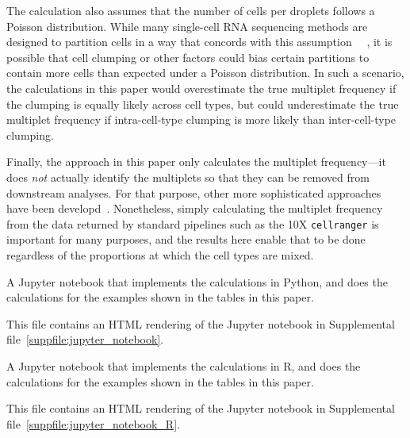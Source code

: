 \documentclass[fleqn,10pt]{wlpeerj} %
\begin{document}
The calculation also assumes that the number of cells per droplets follows a Poisson distribution.
While many single-cell RNA sequencing methods are designed to partition cells in a way that concords with this assumption~~\citep{klein2015droplet,macosko2015highly,zheng2017massively,gierahn2017seq,cao2017comprehensive} , it is possible that cell clumping or other factors could bias certain partitions to contain more cells than expected under a Poisson distribution.
In such a scenario, the calculations in this paper would overestimate the true multiplet frequency if the clumping is equally likely across cell types, but could underestimate the true multiplet frequency if intra-cell-type clumping is more likely than inter-cell-type clumping.

Finally, the approach in this paper only calculates the multiplet frequency---it does \emph{not} actually identify the multiplets so that they can be removed from downstream analyses.
For that purpose, other more sophisticated approaches have been developd~\citep{ilicic2016classification,stoeckius2017cell,kang2018multiplexed,wolock2018scrublet,depasquale2018doubletdecon}.
Nonetheless, simply calculating the multiplet frequency from the data returned by standard pipelines such as the 10X \texttt{cellranger} is important for many purposes, and the results here enable that to be done regardless of the proportions at which the cell types are mixed.





\clearpage

\begin{suppfile}
\caption{\label{suppfile:jupyter_notebook}
A Jupyter notebook that implements the calculations in Python, and does the calculations for the examples shown in the tables in this paper.
}
\end{suppfile}

\begin{suppfile}
\caption{\label{suppfile:html_notebook}
This file contains an HTML rendering of the Jupyter notebook in Supplemental file~\ref{suppfile:jupyter_notebook}.
}
\end{suppfile}

\begin{suppfile}
\caption{\label{suppfile:jupyter_notebook_R}
A Jupyter notebook that implements the calculations in R, and does the calculations for the examples shown in the tables in this paper.
}
\end{suppfile}

\begin{suppfile}
\caption{\label{suppfile:html_notebook_R}
This file contains an HTML rendering of the Jupyter notebook in Supplemental file~\ref{suppfile:jupyter_notebook_R}.
}
\end{suppfile}
\end{document}
